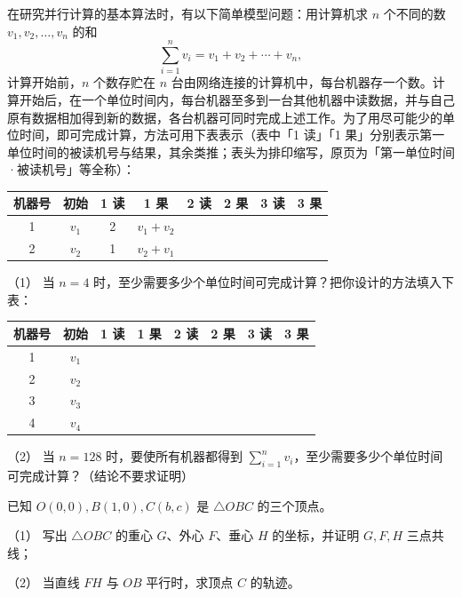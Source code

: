 \begin{question}
在研究并行计算的基本算法时，有以下简单模型问题：用计算机求 \(n\) 个不同的数 \(v_1,v_2,\ldots,v_n\) 的和
\nopagebreak[4]
\[
\sum_{i=1}^{n}v_i=v_1+v_2+\cdots+v_n,
\]
计算开始前，\(n\) 个数存贮在 \(n\) 台由网络连接的计算机中，每台机器存一个数。计算开始后，在一个单位时间内，每台机器至多到一台其他机器中读数据，并与自己原有数据相加得到新的数据，各台机器可同时完成上述工作。为了用尽可能少的单位时间，即可完成计算，方法可用下表表示（表中「1 读」「1 果」分别表示第一单位时间的被读机号与结果，其余类推；表头为排印缩写，原页为「第一单位时间·被读机号」等全称）：

\begin{center}
\begingroup\setlength{\tabcolsep}{4pt}
\begin{tabular}{cccccccc}
\toprule
机器号 & 初始 & 1 读 & 1 果 & 2 读 & 2 果 & 3 读 & 3 果 \\
\midrule
1 & \(v_1\) & 2 & \(v_1+v_2\) &  &  &  &  \\
2 & \(v_2\) & 1 & \(v_2+v_1\) &  &  &  &  \\
\bottomrule
\end{tabular}
\endgroup
\end{center}

（1） 当 \(n=4\) 时，至少需要多少个单位时间可完成计算？把你设计的方法填入下表：

\begin{center}
\begingroup\setlength{\tabcolsep}{4pt}
\begin{tabular}{cccccccc}
\toprule
机器号 & 初始 & 1 读 & 1 果 & 2 读 & 2 果 & 3 读 & 3 果 \\
\midrule
1 & \(v_1\) &  &  &  &  &  &  \\
2 & \(v_2\) &  &  &  &  &  &  \\
3 & \(v_3\) &  &  &  &  &  &  \\
4 & \(v_4\) &  &  &  &  &  &  \\
\bottomrule
\end{tabular}
\endgroup
\end{center}

（2） 当 \(n=128\) 时，要使所有机器都得到 \(\displaystyle\sum_{i=1}^{n}v_i\)，至少需要多少个单位时间可完成计算？（结论不要求证明）

\end{question}
\begin{question}
已知 \(O(0,0),B(1,0),C(b,c)\) 是 \(\triangle OBC\) 的三个顶点。

（1） 写出 \(\triangle OBC\) 的重心 \(G\)、外心 \(F\)、垂心 \(H\) 的坐标，并证明 \(G,F,H\) 三点共线；

（2） 当直线 \(FH\) 与 \(OB\) 平行时，求顶点 \(C\) 的轨迹。

\end{question}

